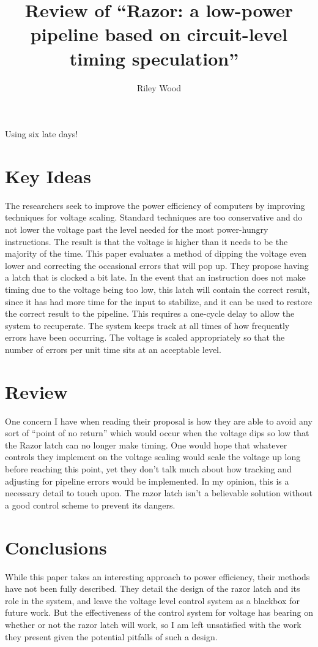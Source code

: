 \documentclass{article}
\title{Review of ``Razor: a low-power pipeline based on circuit-level timing speculation''~\cite{razor}}
\author{Riley Wood}
\begin{document}
\maketitle

Using six late days!

\section*{Key Ideas}
The researchers seek to improve the power efficiency of computers by
improving techniques for voltage scaling. Standard techniques are too
conservative and do not lower the voltage past the level needed for the most
power-hungry instructions. The result is that the voltage is higher than it
needs to be the majority of the time. This paper evaluates a method of
dipping the voltage even lower and correcting the occasional errors that
will pop up. They propose having a latch that is clocked a bit late. In the event that
an instruction does not make timing due to the voltage being too low, this latch
will contain the correct result, since it has had more time for the input to
stabilize, and it can be used to restore the correct result to the pipeline.
This requires a one-cycle delay to allow the system to recuperate. The system
keeps track at all times of how frequently errors have been occurring. The
voltage is scaled appropriately so that the number of errors per unit time sits
at an acceptable level.


\section*{Review}
One concern I have when reading their proposal is how they are able to avoid
any sort of ``point of no return'' which would occur when the voltage dips so
low that the Razor latch can no longer make timing. One would hope that
whatever controls they implement on the voltage scaling would scale the
voltage up long before reaching this point, yet they don't talk much about how
tracking and adjusting for pipeline errors would be implemented. In my opinion,
this is a necessary detail to touch upon. The razor latch isn't a believable solution
without a good control scheme to prevent its dangers.


\section*{Conclusions}
While this paper takes an interesting approach to power efficiency, their
methods have not been fully described. They detail the design of the razor latch
and its role in the system, and leave the voltage level control system as a
blackbox for future work. But the effectiveness of the control system for
voltage has bearing on whether or not the razor latch will work, so I am left
unsatisfied with the work they present given the potential pitfalls of such a
design.




\end{document}
